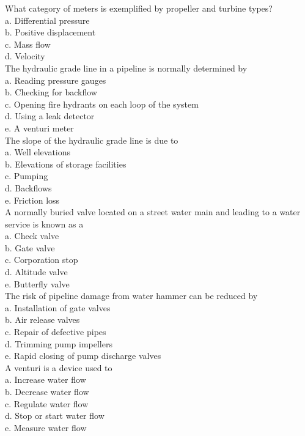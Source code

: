 What category of meters is exemplified by propeller and turbine types?\\
a. Differential pressure\\
b.  Positive displacement \\
c. Mass flow\\
d.  Velocity\\

The hydraulic grade line in a pipeline is normally determined by\\
a. Reading pressure gauges\\
b. Checking for backflow\\
c. Opening fire hydrants on each loop of the system\\
d. Using a leak detector\\
e. A venturi meter\\

  The slope of the hydraulic grade line is due to\\
a. Well elevations\\
b. Elevations of storage facilities\\
c. Pumping\\
d. Backflows\\
e. Friction loss\\

  A normally buried valve located on a street water main and leading to a water service is known as a\\
a. Check valve\\
b. Gate valve\\
c. Corporation stop\\
d. Altitude valve\\
e. Butterfly valve\\

  The risk of pipeline damage from water hammer can be reduced by\\
a. Installation of gate valves\\
b. Air release valves\\
c. Repair of defective pipes\\
d. Trimming pump impellers\\
e. Rapid closing of pump discharge valves \\

A venturi is a device used to\\
a. Increase water flow\\
b. Decrease water flow\\
c. Regulate water flow\\
d. Stop or start water flow\\
e. Measure water flow\\

